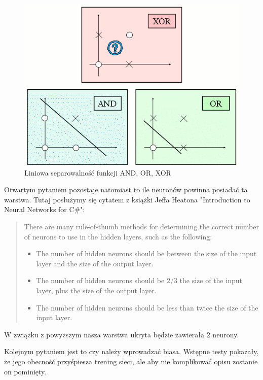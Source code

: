\begin{figure}[!ht]
  \includegraphics[width=\linewidth]{images/andorxor.png}
  \caption{Liniowa separowalność funkcji AND, OR, XOR}
  \label{fig:separability}
\end{figure}

Otwartym pytaniem pozostaje natomiast to ile neuronów powinna posiadać ta warstwa.
Tutaj posłużymy się cytatem z książki Jeffa Heatona "Introduction to Neural Networks for C\#":
\begin{quote}
  There are many rule-of-thumb methods for determining the correct number of neurons to use in the hidden layers, such as the following:
  \begin{itemize}
    \item  The number of hidden neurons should be between the size of the input layer and the size of the output layer.  
    \item   The number of hidden neurons should be 2/3 the size of the input layer, plus the size of the output layer.
    \item   The number of hidden neurons should be less than twice the size of the input layer.
  \end{itemize}
\end{quote}

W związku z powyższym nasza warstwa ukryta będzie zawierała 2 neurony.

Kolejnym pytaniem jest to czy należy wprowadzać biasa.
Wstępne testy pokazały, że jego obecność przyśpiesza trening sieci,
ale aby nie komplikować opisu zostanie on pominięty.

